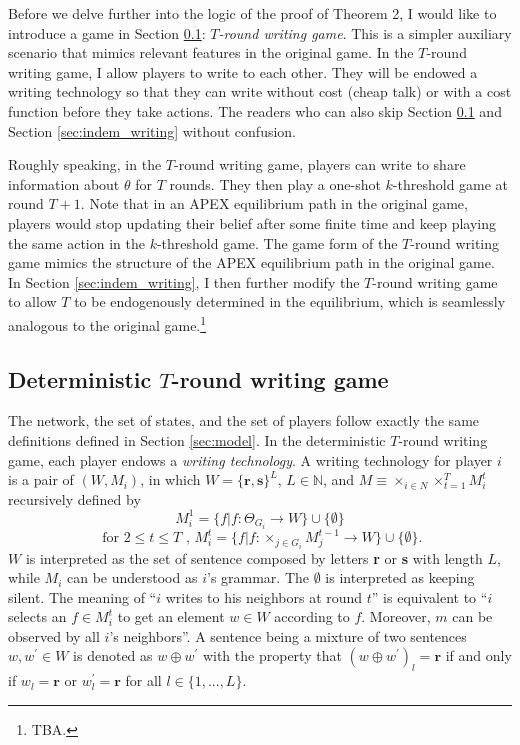 \documentclass[12pt,letter]{article}
\theoremstyle{definition}
\theoremstyle{remark}
\theoremstyle{claim}
\begin{document}
Before we delve further into the logic of the proof of Theorem 2, I would like to introduce a game in Section \ref{sec:writing}: \textit{$T$-round writing game}. This is a simpler auxiliary scenario that mimics relevant features in the original game. In the $T$-round writing game, I allow players to write to each other. They will be endowed a writing technology so that they can write without cost (cheap talk) or with a cost function before they take actions. The readers who can also skip Section \ref{sec:writing} and Section \ref{sec:indem_writing} without confusion.
 

Roughly speaking, in the $T$-round writing game, players can write to share information about $\theta$ for $T$ rounds. They then play a one-shot $k$-threshold game at round $T+1$. Note that in an APEX equilibrium path in the original game, players would stop updating their belief after some finite time and keep playing the same action in the $k$-threshold game. The game form of the $T$-round writing game mimics the structure of the APEX equilibrium path in the original game. In Section \ref{sec:indem_writing}, I then further modify the $T$-round writing game to allow $T$ to be endogenously determined in the equilibrium, which is seamlessly analogous to the original game.\footnote{TBA.}  

  

\subsection{Deterministic $T$-round writing game}
\label{sec:writing}
The network, the set of states, and the set of players follow exactly the same definitions defined in Section \ref{sec:model}. In the deterministic $T$-round writing game, each player endows a \textit{writing technology}. A writing technology for player $i$ is a pair of $(W,M_i)$, in which $W=\{{\textbf{r}},\textbf{s}\}^L$, $L\in \mathbb{N}$, and $M\equiv \times_{i\in N}\times^T_{t=1}M^{t}_i$ recursively defined by
\[M^1_i=\{f|f:\Theta_{G_i}\rightarrow W\}\cup \{\emptyset\}\]
\[ \text{ for } 2\leq t \leq T\text{ , }M^{t}_i=\{f|f:\times_{j\in G_i}M^{t-1}_j\rightarrow W\}\cup \{\emptyset\}. \]
$W$ is interpreted as the set of sentence composed by letters \textbf{r} or \textbf{s} with length $L$, while $M_i$ can be understood as $i$'s grammar. The $\emptyset$ is interpreted as keeping silent. The meaning of ``$i$ writes to his neighbors at round $t$'' is equivalent to ``$i$ selects an $f\in M^t_i$ to get an element $w\in W$ according to $f$.  Moreover, $m$ can be observed by all $i$'s neighbors''. A sentence being a mixture of two sentences $w,w^{'}\in W$ is denoted as $w\oplus w^{'}$ with the property that $(w\oplus w^{'})_l=\textbf{r}$ if and only if $w_l=\textbf{r}$ or $w^{'}_l=\textbf{r}$ for all $l\in \{1,...,L\}$. 
\end{document}
